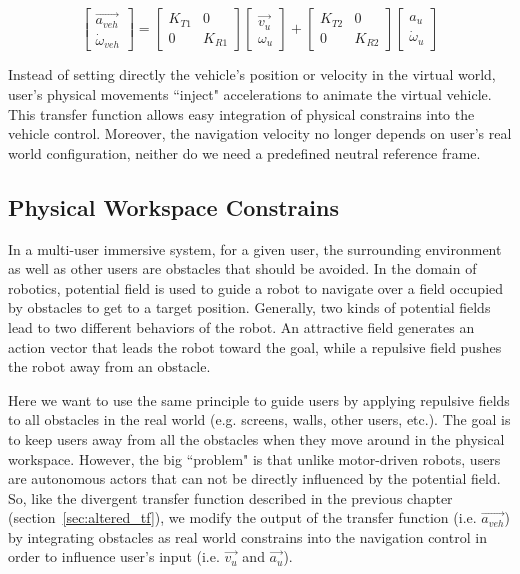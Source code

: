 \begin{equation}
\begin{bmatrix}
\overrightarrow{a_{veh}} \\ \dot{\omega}_{veh}
\end{bmatrix}=
\begin{bmatrix}
K_{T1} & 0 \\ 0 & K_{R1}
\end{bmatrix}
\begin{bmatrix}
\overrightarrow{v_{u}} \\ \omega_{u}
\end{bmatrix} + 
\begin{bmatrix}
K_{T2} & 0 \\ 0 & K_{R2}
\end{bmatrix}
\begin{bmatrix}
a_{u} \\ \dot{\omega}_{u}
\end{bmatrix}
\end{equation}

Instead of setting directly the vehicle's position or velocity in the virtual world, user's physical movements ``inject" accelerations to animate the virtual vehicle. This transfer function allows easy integration of physical constrains into the vehicle control. Moreover, the navigation velocity no longer depends on user's real world configuration, neither do we need a predefined neutral reference frame.


\subsection{Physical Workspace Constrains}
In a multi-user immersive system, for a given user, the surrounding environment as well as other users are obstacles that should be avoided. In the domain of robotics, potential field is used to guide a robot to navigate over a field occupied by obstacles to get to a target position. Generally, two kinds of potential fields lead to two different behaviors of the robot. An attractive field generates an action vector that leads the robot toward the goal, while a repulsive field pushes the robot away from an obstacle.

Here we want to use the same principle to guide users by applying repulsive fields to all obstacles in the real world (e.g. screens, walls, other users, etc.). The goal is to keep users away from all the obstacles when they move around in the physical workspace. However, the big ``problem" is that unlike motor-driven robots, users are autonomous actors that can not be directly influenced by the potential field. So, like the divergent transfer function described in the previous chapter (section~\ref{sec:altered_tf}), we modify the output of the transfer function (i.e. $\overrightarrow{a_{veh}}$) by integrating obstacles as real world constrains into the navigation control in order to influence user's input (i.e. $\overrightarrow{v_{u}}$ and $\overrightarrow{a_{u}}$).


